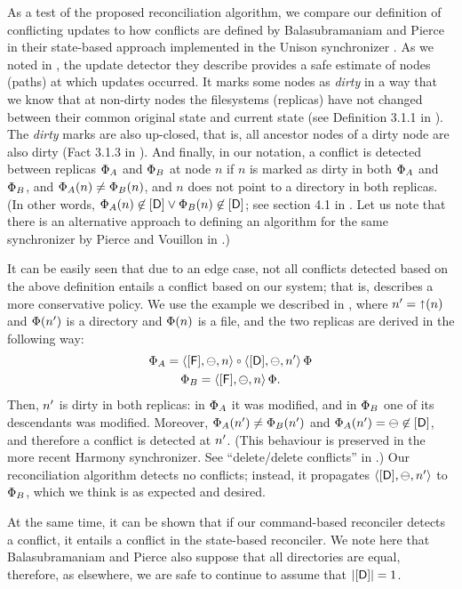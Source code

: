 As a test of the proposed reconciliation algorithm, 
we compare our definition of conflicting
updates to how conflicts are defined by Balasubramaniam and Pierce
in their state-based approach implemented in the Unison synchronizer \cite{BP}.
As we noted in \cite{NREC}, the update detector they describe provides a safe estimate of nodes
(paths) at which updates occurred.
It marks some nodes as \emph{dirty} in a way that we know that at non-dirty nodes
the filesystems (replicas) have not changed between their common original state and current state
(see Definition 3.1.1 in \cite{BP}).
The \emph{dirty} marks are also up-closed, that is, all ancestor nodes of a dirty node
are also dirty (Fact 3.1.3 in \cite{BP}).
And finally, in our notation, 
a conflict is detected between replicas $\Phi_A$ and $\Phi_B$ at node $n$
if $n$ is marked as dirty in both $\Phi_A$ and $\Phi_B$, and
$\Phi_A(n)\neq\Phi_B(n)$, and $n$ does not point to a directory in both replicas.
(In other words, 
$\Phi_A(n)\not\in[\mathsf{D}] \vee \Phi_B(n)\not\in[\mathsf{D}]$; see section 4.1 in \cite{BP}.
Let us note that there is an alternative approach to defining an algorithm for
the same synchronizer by Pierce and Vouillon in \cite{PV}.)

It can be easily seen that due to an edge case, 
not all conflicts detected based on the above definition
entails a conflict based on our system; that is, \cite{BP} describes a more
conservative policy.
We use the example we described in \cite{NREC},
where $n'=\mathord{\shortuparrow}(n)$ and $\Phi(n')$ is a directory and $\Phi(n)$ is a file, and
the two replicas are derived in the following way:
\begin{gather*}
\FS_A = \cfba{n} \cc \cdba{\nn} \aFS \\
\FS_B = \cfba{n} \aFS.
\end{gather*}
Then, $n'$ is dirty in both replicas:
in $\Phi_A$ it was modified, and in $\Phi_B$ one of its descendants was modified.
Moreover, $\Phi_A(n')\neq\Phi_B(n')$ and $\Phi_A(n')=\ominus\not\in[\mathsf{D}]$,
and therefore a conflict is detected at $n'$.
(This behaviour is preserved in the more recent Harmony synchronizer.
See ``delete/delete conflicts'' in \cite{PSG,FGKPS}.)
Our reconciliation algorithm detects no conflicts;
instead, it propagates $\langle{[\mathsf{D}],\ominus,n'}\rangle$ to $\Phi_B$, which we think is as expected
and desired.

At the same time, it can be shown that if our command-based reconciler
detects a conflict, it entails a conflict in the state-based reconciler.
We note here that Balasubramaniam and Pierce also suppose that all directories are equal,
therefore, as elsewhere, we are safe to continue to assume that $|[\mathsf{D}]|=1$.

